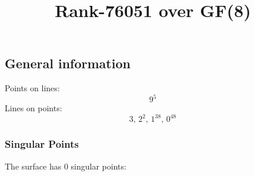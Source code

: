 \documentclass{article}
\newcommand\setTBstruts{\def\T{\rule{0pt}{2.6ex}}%
\def\B{\rule[-1.2ex]{0pt}{0pt}}}
\begin{document}
 
\setTBstruts



{\allowdisplaybreaks%






\title{Rank-76051 over GF(8)}
\author{}%
\maketitle%
%
{}



\subsection*{General information}
Points on lines:
$$
9^5$$
Lines on points:
$$
3,\,2^2,\,1^{38},\,0^{48}$$
\subsubsection*{Singular Points}
The surface has 0 singular points:\\
\begin{align*}
\end{align*}
}
\end{document}
